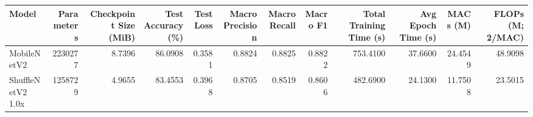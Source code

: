 \begin{tabular}{lrrrrrrrrrrr}
\toprule
Model & Parameters & Checkpoint Size (MiB) & Test Accuracy (\%) & Test Loss & Macro Precision & Macro Recall & Macro F1 & Total Training Time (s) & Avg Epoch Time (s) & MACs (M) & FLOPs (M; 2/MAC) \\
\midrule
MobileNetV2 & 2230277 & 8.7396 & 86.0908 & 0.3581 & 0.8824 & 0.8825 & 0.8822 & 753.4100 & 37.6600 & 24.4549 & 48.9098 \\
ShuffleNetV2 1.0x & 1258729 & 4.9655 & 83.4553 & 0.3968 & 0.8705 & 0.8519 & 0.8606 & 482.6900 & 24.1300 & 11.7508 & 23.5015 \\
\bottomrule
\end{tabular}
